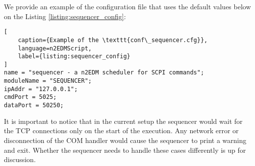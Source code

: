 We provide an example of the configuration file that uses the default values below on the Listing \ref{listing:sequencer_config}:

\begin{lstlisting}[
	caption={Example of the \texttt{conf\_sequencer.cfg}},
	language=n2EDMScript,
	label={listing:sequencer_config}
]
name = "sequencer - a n2EDM scheduler for SCPI commands";
moduleName = "SEQUENCER";
ipAddr = "127.0.0.1";
cmdPort = 5025;
dataPort = 50250;
\end{lstlisting}

It is important to notice that in the current setup the sequencer would wait for the TCP connections only on the start of the execution. Any network error or disconnection of the COM handler would cause the sequencer to print a warning and exit. Whether the sequencer needs to handle these cases differently is up for discussion.